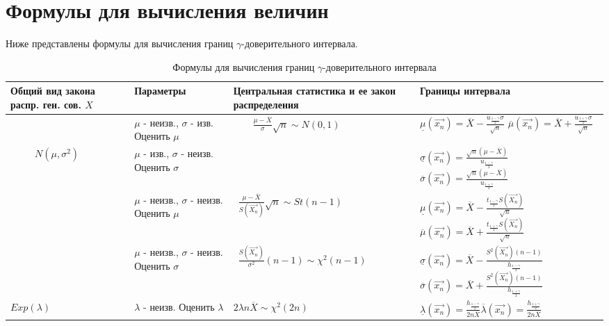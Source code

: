 \section*{Формулы для вычисления величин}
Ниже представлены формулы для вычисления границ $\gamma$-доверительного интервала. \\
\begin{table}[h!]
	\caption{Формулы для вычисления границ $\gamma$-доверительного интервала}
\begin{tabular}{|p{3cm}|p{2cm}|p{5cm}|p{5cm}|}
	\hline
	Общий вид закона распр. ген. сов. $X$ & Параметры & Центральная статистика и ее закон распределения & Границы интервала \\
	\hline
	 & $\mu$ - неизв., $\sigma$ - изв. Оценить $\mu$
	& 	~\newline	~\newline~~$\frac{\mu-\overline{X}}{\sigma}\sqrt{n} \sim N(0,1)$ & $\underline\mu(\overrightarrow{x_n}) = \overline{X} - \frac{ u_{\frac{1-\gamma}{2}}\sigma}{\sqrt{n}}$ \newline $\overline\mu(\overrightarrow{x_n}) = \overline{X} + \frac{ u_{\frac{1+\gamma}{2}}\sigma}{\sqrt{n}}$ \\
	\cline{2-2}\cline{4-4}
	~\newline~\newline~~~$N(\mu,\sigma^2)$& $\mu$ - изв., $\sigma$ - неизв. Оценить $\sigma$
	& &  $\underline\sigma(\overrightarrow{x_n}) = \frac{ \sqrt{n}(\mu-\overline{X})}{u_\frac{1-\gamma}{2}}$ \newline $\overline\sigma(\overrightarrow{x_n}) = \frac{ \sqrt{n}(\mu-\overline{X})}{u_\frac{1+\gamma}{2}}$ \\
	\cline{2-4}
	&$\mu$ - неизв., $\sigma$ - неизв. Оценить $\mu$
	& ~\newline $\frac{\mu-\overline{X}}{S(\overrightarrow{X_n})}\sqrt{n} \sim St(n-1)$ & $\underline\mu(\overrightarrow{x_n}) = \overline{X} - \frac{ t_{\frac{1-\gamma}{2}}S(\overrightarrow{X_n})}{\sqrt{n}}$ \newline $\overline\mu(\overrightarrow{x_n}) = \overline{X} + \frac{ t_{\frac{1+\gamma}{2}}S(\overrightarrow{X_n})}{\sqrt{n}}$  \\
	\cline{2-4}
	&$\mu$ - неизв., $\sigma$ - неизв. Оценить $\sigma$
	& ~\newline $\frac{S(\overrightarrow{X_n})}{\sigma^2}(n-1) \sim \chi^2(n-1)$ &  $\underline\sigma(\overrightarrow{x_n}) = \overline{X} - \frac{ S^2(\overrightarrow{X_n})(n-1)}{h_{\frac{1-\gamma}{2}}}$ \newline $\overline\sigma(\overrightarrow{x_n}) = \overline{X} + \frac{ S^2(\overrightarrow{X_n})(n-1)}{h_{\frac{1+\gamma}{2}}}$  \\
	\hline
	$Exp(\lambda)$& $\lambda$ - неизв. Оценить $\lambda$
	& $2\lambda n \overline{X}\sim \chi^2(2n)$&  $\underline\lambda(\overrightarrow{x_n}) = \frac{h_{\frac{1-\gamma}{2}}}{2n\overline{X}}$\newline $\overline\lambda(\overrightarrow{x_n}) = \frac{h_{\frac{1+\gamma}{2}}}{2n\overline{X}}$\\
			\hline
\end{tabular}
\end{table}
